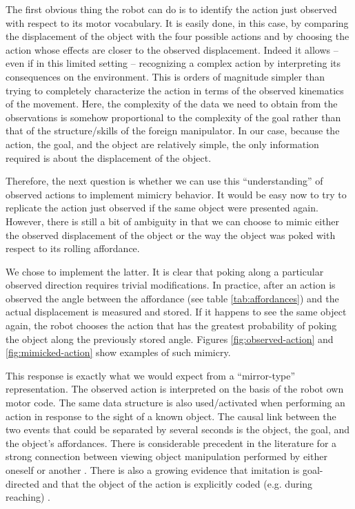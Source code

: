The first obvious thing the robot can do is to identify the action just observed 
with respect to its motor vocabulary. It is easily done, in this case, by comparing 
the displacement of the object with the four possible actions and by choosing the
action whose effects are closer to the observed displacement.
Indeed it allows -- even if in this limited setting -- recognizing 
a complex action by interpreting its consequences on the environment.
This is orders of magnitude simpler than trying to completely characterize the
action in terms of the observed kinematics of the movement. Here, the complexity
of the data we need to obtain from the observations is somehow proportional to the complexity
of the goal rather than that of the structure/skills of the foreign manipulator. In our case, because 
the action, the goal, and the object are relatively simple, the only information 
required is about the displacement of the object. 

Therefore, the next question is whether we can use this ``understanding'' of 
observed actions to implement mimicry behavior. It 
would be easy now to try to replicate the action just observed if the same
object were presented again. However, there is still a bit of ambiguity in that
we can choose to mimic either the observed displacement of the object or 
the way the object was poked with respect to its rolling affordance.
 
We chose to implement the latter. It is clear that poking along a particular 
observed direction requires trivial modifications. In practice, after an 
action is observed the angle between the affordance (see table \ref{tab:affordances}) and
the actual displacement is measured and stored. If it happens to see the same 
object again, the robot chooses the action that has the greatest 
probability of poking the object along the previously stored angle. 
Figures \ref{fig:observed-action} and \ref{fig:mimicked-action} show examples of such mimicry.


This response is exactly what we would expect from a ``mirror-type'' representation.
The observed action is interpreted on the basis of the robot own motor code. The same
data structure is also used/activated when performing an action in response to the
sight of a known object. The causal link between the two events that could be separated
by several seconds is the object, the goal, and the object's affordances. There is 
considerable precedent in the literature for a strong connection between viewing 
object manipulation performed by either oneself or another \cite{wohlsclager02human}.
There is also a growing evidence that imitation is goal-directed 
\cite{bekkering-wohlschlager-2000} and that the object of the action is explicitly 
coded (e.g. during reaching) \cite{woodward-1998}.


